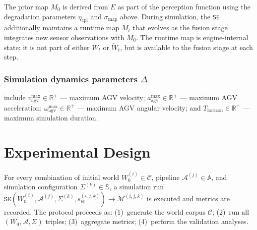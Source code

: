 \documentclass[conference]{IEEEtran}
\begin{document}
The prior map $M_0$ is derived from $E$ as part of the perception function using the degradation parameters $\eta_{\text{cpl}}$ and $\sigma_{\text{map}}$ above. During simulation, the \texttt{SE} additionally maintains a runtime map $M_t$ that evolves as the fusion stage integrates new sensor observations with $M_0$. The runtime map is engine-internal state: it is not part of either $W_t$ or $\tilde{W}_t$, but is available to the fusion stage at each step.
 
\subsubsection{Simulation dynamics parameters $\Delta$} include $v_{\text{agv}}^{\max} \in \mathbb{R}^+$ --- maximum AGV velocity; $a_{\text{agv}}^{\max} \in \mathbb{R}^+$ --- maximum AGV acceleration; $\omega_{\text{agv}}^{\max} \in \mathbb{R}^+$ --- maximum AGV angular velocity; and $T_{\text{horizon}} \in \mathbb{R}^+$ --- maximum simulation duration.
 
 
\section{Experimental Design}
\label{sec:experimental-design}
 
For every combination of initial world $W_0^{(i)} \in \mathcal{C}$, pipeline $\mathcal{A}^{(j)} \in \mathbb{A}$, and simulation configuration $\Sigma^{(k)} \in \mathbb{S}$, a simulation run $\texttt{SE}(W_0^{(i)}, \mathcal{A}^{(j)}, \Sigma^{(k)}, s_{\text{se}}^{(i,j,k)}) \to \mathcal{M}^{(i,j,k)}$ is executed and metrics are recorded. The protocol proceeds as: (1)~generate the world corpus $\mathcal{C}$; (2)~run all $(W_0, \mathcal{A}, \Sigma)$ triples; (3)~aggregate metrics; (4)~perform the validation analyses.
\end{document}
